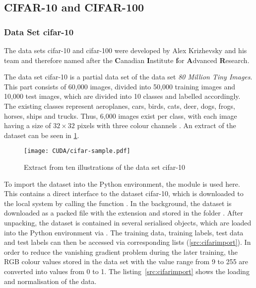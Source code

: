 %
%


\subsection{CIFAR-10 and CIFAR-100}




\subsubsection{Data Set \ac{cifar}-10}\label{sec:dataset}

The data sets \ac{cifar}-10 and \ac{cifar}-100  were developed by Alex Krizhevsky and his team and therefore named after the \textbf{C}anadian \textbf{I}nstitute \textbf{f}or \textbf{A}dvanced \textbf{R}esearch.  



The data set \ac{cifar}-10 is a partial data set of the data set \emph{80 Million Tiny Images}. This part consists of 60,000 images, divided into 50,000 training images and 10,000 test images, which are divided into 10 classes and labelled accordingly. The existing classes represent aeroplanes, cars, birds, cats, deer, dogs, frogs, horses, ships and trucks. Thus, 6,000 images exist per class, with each image having a size of $32\times32$ pixels with three colour channels \cite{Krizhevsky:2009,Krizhevsky:2017}. An extract of the dataset can be seen in \cref{fig:cifar-example}.

\begin{figure}[htb]
	\centering
	\texttt{[image: CUDA/cifar-sample.pdf]}
	\caption{Extract from ten illustrations of the data set \ac{cifar}-10}
	\label{fig:cifar-example}
\end{figure}

To import the dataset into the Python environment, the module  is used here. This contains a direct interface to the dataset \ac{cifar}-10, which is downloaded to the local system by calling the function . In the background, the dataset is downloaded as a packed file with the extension  and stored in the folder . After unpacking, the dataset is contained in several serialised objects, which are loaded into the Python environment via . The training data, training labels, test data and test labels can then be accessed via corresponding lists (\cref{src:cifarimport}). In order to reduce the vanishing gradient problem during the later training, the RGB colour values stored in the data set with the value range from 9 to 255 are converted into values from 0 to 1. The listing~\ref{src:cifarimport} shows the loading and normalisation of the data.



